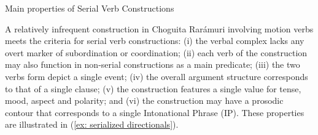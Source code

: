 \ea\label{ex: serial verb constructions defined}
{Main properties of Serial Verb Constructions}

    \z
\z

A relatively infrequent construction in Choguita Rarámuri involving motion verbs meets the criteria for serial verb constructions: (i) the verbal complex lacks any overt marker of subordination or coordination; (ii) each verb of the construction may also function in non-serial constructions as a main predicate; (iii) the two verbs form depict a single event; (iv) the overall argument structure corresponds to that of a single clause; (v) the construction features a single value for tense, mood, aspect and polarity; and (vi) the construction may have a prosodic contour that corresponds to a single Intonational Phrase (IP). These properties are illustrated in (\ref{ex: serialized directionals}).

\ea\label{ex: serialized directionals}

